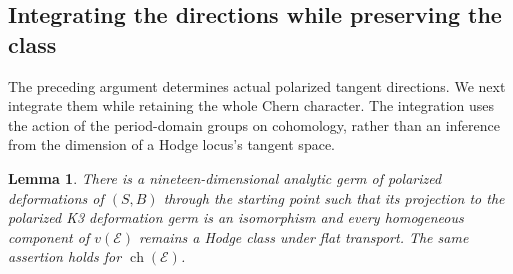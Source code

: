 \documentclass[11pt]{article}
\numberwithin{equation}{section}
\newtheorem{lemma}[theorem]{Lemma}
\theoremstyle{definition}
\theoremstyle{remark}
\begin{document}
\subsection{Integrating the directions while preserving the class}

The preceding argument determines actual polarized tangent directions.
We next integrate them while retaining the whole Chern character.
The integration uses the action of the period-domain groups on
cohomology, rather than an inference from the dimension of a Hodge
locus's tangent space.

\begin{lemma}\label{lem:Hodge-germ}
There is a nineteen-dimensional analytic germ of polarized deformations
of $(S,B)$ through the starting point such that its projection to the
polarized K3 deformation germ is an isomorphism and every homogeneous
component of $v(\mathcal E)$ remains a Hodge class under flat transport.
The same assertion holds for $\operatorname{ch}(\mathcal E)$.
\end{lemma}
\end{document}
